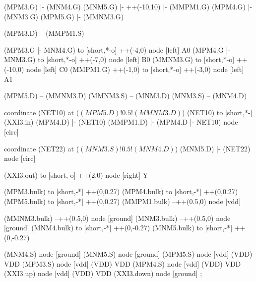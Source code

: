 \begin{circuitikz}[american]
	
	(MPM3.G) |- (MNM4.G)
	(MNM5.G) |- ++(-10,10) |- (MMPM1.G)
	(MPM4.G) |- (MNM3.G)
	(MPM5.G) |- (MMNM3.G)
	
	(MPM3.D) -- (MMPM1.S)
	
	(MPM3.G |- MNM4.G) to [short,*-o] ++(-4,0) node [left] {A0}
	(MPM4.G |- MNM3.G) to [short,*-o] ++(-7,0) node [left] {B0}
	(MMNM3.G) to [short,*-o] ++(-10,0) node [left] {C0}
	(MMPM1.G) ++(-1,0) to [short,*-o] ++(-3,0) node [left] {A1}
	
	(MPM5.D) -- (MMNM3.D)
	(MMNM3.S) -- (MNM3.D)
	(MNM3.S) -- (MNM4.D)
	
	coordinate (NET10) at ($(MPM5.D)!0.5!(MMNM3.D)$)
	(NET10) to [short,*-] (XXI3.in)
	(MPM4.D) |- (NET10)
	(MMPM1.D) |- (MPM4.D |- NET10) node [circ] {}
	
	coordinate (NET22) at ($(MNM3.S)!0.5!(MNM4.D)$)
	(MNM5.D) |- (NET22) node [circ] {}
	
	(XXI3.out) to [short,-o] ++(2,0) node [right] {Y}
	
	(MPM3.bulk) to [short,-*] ++(0,0.27)
	(MPM4.bulk) to [short,-*] ++(0,0.27)	
	(MPM5.bulk) to [short,-*] ++(0,0.27)	
	(MMPM1.bulk) --++(0.5,0) node [vdd]{}
	
	(MMNM3.bulk) --++(0.5,0) node [ground]{}
	(MNM3.bulk) --++(0.5,0) node [ground]{}
	(MNM4.bulk) to [short,-*] ++(0,-0.27)
	(MNM5.bulk) to [short,-*] ++(0,-0.27)


	(MNM4.S) node [ground] {}
	(MNM5.S) node [ground] {}
	(MPM5.S) node [vdd] (VDD) {VDD}
	(MPM3.S) node [vdd] (VDD) {VDD}
	(MPM4.S) node [vdd] (VDD) {VDD}
	(XXI3.up) node [vdd] (VDD) {VDD}
	(XXI3.down) node [ground] {}
;

\end{circuitikz}
